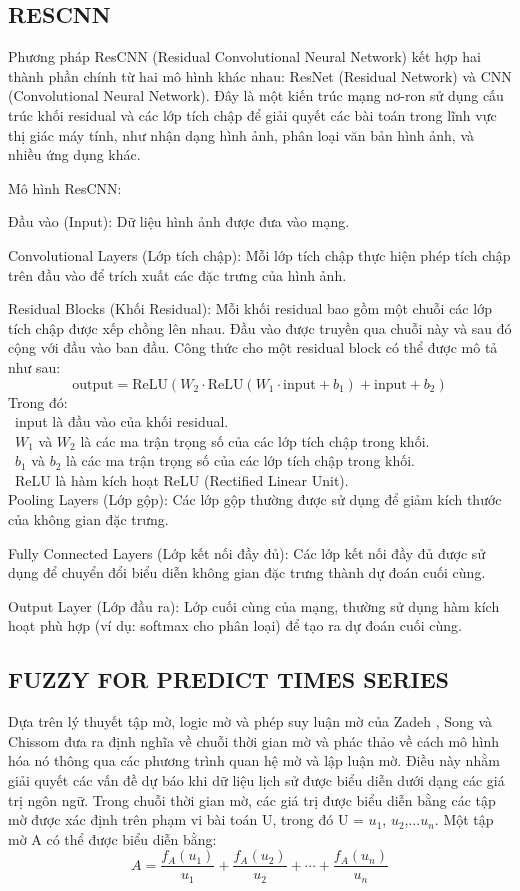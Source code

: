 \documentclass[conference]{IEEEtran}
\begin{document}
\subsection{RESCNN}
Phương pháp ResCNN (Residual Convolutional Neural Network) kết hợp hai thành phần chính từ hai mô hình khác nhau: ResNet (Residual Network) và CNN (Convolutional Neural Network). Đây là một kiến trúc mạng nơ-ron sử dụng cấu trúc khối residual và các lớp tích chập để giải quyết các bài toán trong lĩnh vực thị giác máy tính, như nhận dạng hình ảnh, phân loại văn bản hình ảnh, và nhiều ứng dụng khác.

Mô hình ResCNN:

Đầu vào (Input): Dữ liệu hình ảnh được đưa vào mạng.

Convolutional Layers (Lớp tích chập): Mỗi lớp tích chập thực hiện phép tích chập trên đầu vào để trích xuất các đặc trưng của hình ảnh.

Residual Blocks (Khối Residual): Mỗi khối residual bao gồm một chuỗi các lớp tích chập được xếp chồng lên nhau. Đầu vào được truyền qua chuỗi này và sau đó cộng với đầu vào ban đầu. 
Công thức cho một residual block có thể được mô tả như sau: 
\[
\text{output} = \text{ReLU}(W_2 \cdot \text{ReLU}(W_1 \cdot \text{input} + b_1) + \text{input} + b_2)
\]
Trong đó:\\
        \indent\textbullet\ input là đầu vào của khối residual. \\
	\indent\textbullet\ $W_1$ và $W_2$ là các ma trận trọng số của các lớp tích chập trong khối. \\
 	\indent\textbullet\ $b_1$ và $b_2$ là các ma trận trọng số của các lớp tích chập trong khối. \\
 	\indent\textbullet\ ReLU là hàm kích hoạt ReLU (Rectified Linear Unit). \\

Pooling Layers (Lớp gộp): Các lớp gộp thường được sử dụng để giảm kích thước của không gian đặc trưng.

Fully Connected Layers (Lớp kết nối đầy đủ): Các lớp kết nối đầy đủ được sử dụng để chuyển đổi biểu diễn không gian đặc trưng thành dự đoán cuối cùng.

Output Layer (Lớp đầu ra): Lớp cuối cùng của mạng, thường sử dụng hàm kích hoạt phù hợp (ví dụ: softmax cho phân loại) để tạo ra dự đoán cuối cùng.
\subsection{FUZZY FOR PREDICT TIMES SERIES}
Dựa trên lý thuyết tập mờ, logic mờ và phép suy luận mờ của Zadeh , Song và Chissom  đưa ra định nghĩa về chuỗi thời gian mờ và phác thảo về cách mô hình hóa nó thông qua các phương trình quan hệ mờ và lập luận mờ. Điều này nhằm giải quyết các vấn đề dự báo khi dữ liệu lịch sử được biểu diễn dưới dạng các giá trị ngôn ngữ.
Trong chuỗi thời gian mờ, các giá trị được biểu diễn bằng các tập mờ được xác định trên phạm vi bài toán U, trong đó U = {$u_1$, $u_2$,...$u_n$}. Một tập mờ A có thể được biểu diễn bằng:
\[A = \frac{f_A(u_1)}{u_1} + \frac{f_A(u_2)}{u_2} + \cdots + \frac{f_A(u_n)}{u_n}\]
\end{document}
